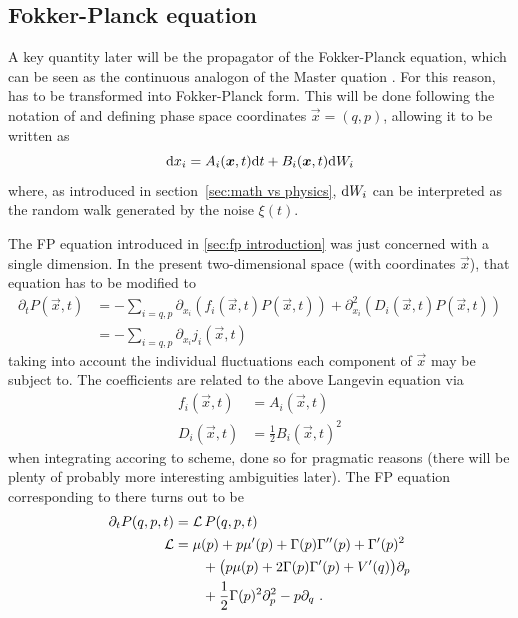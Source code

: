 \subsection{Fokker-Planck equation}

A key quantity later will be the propagator of the Fokker-Planck equation, which can be seen as the continuous analogon of the Master quation . For this reason,  has to be transformed into Fokker-Planck form. This will be done following the notation of \cite{sf} and defining phase space coordinates \(\vec x = (q,p)\), allowing it to be written as
%
\begin{equation}
	\mathrm{d} x_i = A_i(\boldsymbol{x},t)\mathrm{d} t + B_i(\boldsymbol{x}, t)\mathrm{d} W_i
\end{equation}
%
where, as introduced in section~\ref{sec:math vs physics}, \(\mathrm{d} W_i\) can be interpreted as the random walk generated by the noise \(\xi(t)\).

The FP equation introduced in \ref{sec:fp introduction} was just concerned with a single dimension. In the present two-dimensional space (with coordinates \(\vec x\)), that equation has to be modified to
%
\begin{align}
	\label{eqn:fp phase}
	\partial_tP(\vec x,t)
	&= - \sum_{i=q,p} \partial_{x_i} (f_i(\vec x,t)P(\vec x,t)) + \partial_{x_i}^2 (D_i(\vec x,t)P(\vec x,t)) \\
	&= - \sum_{i=q,p} \partial_{x_i}j_i(\vec x,t)
\end{align}
%
taking into account the individual fluctuations each component of \(\vec x\) may be subject to. The coefficients are related to the above Langevin equation via
%
\begin{align}
	f_i(\vec x,t) &= A_i(\vec x,t) \\
	D_i(\vec x,t) &= \frac12B_i(\vec x,t)^2
\end{align}
%
when integrating accoring to \Ito{} scheme, done so for pragmatic reasons (there will be plenty of probably more interesting ambiguities later).
The FP equation corresponding to  there turns out to be
%
\begin{equation}\begin{split}
	\partial_t P(q,p,t) &= \mathcal{L} \, P(q,p,t) \\
	\mathcal{L} &= \mu(p)+p\mu'(p) + \Gamma(p)\Gamma''(p) + \Gamma'(p)^2 \\
	&\qquad +\bigl(p\mu(p) + 2\Gamma(p)\Gamma'(p) + V'(q)\bigr)\partial_p \\
	&\qquad +\frac12\Gamma(p)^2\partial_p^2 - p\partial_q ~.
\end{split}\end{equation}






